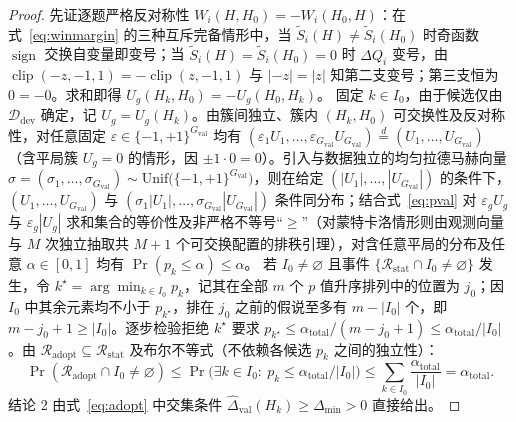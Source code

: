 \documentclass[UTF8,a4paper,10.5pt]{ctexart}
\newcommand{\Ddev}{\mathcal{D}_{\mathrm{dev}}}
\newcommand{\clip}{\operatorname{clip}}
\newcommand{\sgn}{\operatorname{sign}}
\begin{document}
\begin{proof}
先证逐题严格反对称性 $W_i(H,H_0)=-W_i(H_0,H)$：在式~\eqref{eq:winmargin} 的三种互斥完备情形中，当 $\tilde{S}_i(H)\neq\tilde{S}_i(H_0)$ 时奇函数 $\sgn$ 交换自变量即变号；当 $\tilde{S}_i(H)=\tilde{S}_i(H_0)=0$ 时 $\Delta Q_i$ 变号，由 $\clip(-z,-1,1)=-\clip(z,-1,1)$ 与 $|-z|=|z|$ 知第二支变号；第三支恒为 $0=-0$。求和即得 $U_g(H_k,H_0)=-U_g(H_0,H_k)$。
固定 $k\in I_0$，由于候选仅由 $\Ddev$ 确定，记 $U_g=U_g(H_k)$。由簇间独立、簇内 $(H_k,H_0)$ 可交换性及反对称性，对任意固定 $\varepsilon\in\{-1,+1\}^{G_{\mathrm{val}}}$ 均有 $(\varepsilon_1 U_1,\dots,\varepsilon_{G_{\mathrm{val}}}U_{G_{\mathrm{val}}})\stackrel{d}{=}(U_1,\dots,U_{G_{\mathrm{val}}})$（含平局簇 $U_g=0$ 的情形，因 $\pm 1\cdot 0=0$）。引入与数据独立的均匀拉德马赫向量 $\sigma=(\sigma_1,\dots,\sigma_{G_{\mathrm{val}}})\sim\mathrm{Unif}\bigl(\{-1,+1\}^{G_{\mathrm{val}}}\bigr)$，则在给定 $(|U_1|,\dots,|U_{G_{\mathrm{val}}}|)$ 的条件下，$(U_1,\dots,U_{G_{\mathrm{val}}})$ 与 $(\sigma_1|U_1|,\dots,\sigma_{G_{\mathrm{val}}}|U_{G_{\mathrm{val}}}|)$ 条件同分布；结合式~\eqref{eq:pval} 对 $\varepsilon_g U_g$ 与 $\varepsilon_g|U_g|$ 求和集合的等价性及非严格不等号“$\ge$”（对蒙特卡洛情形则由观测向量与 $M$ 次独立抽取共 $M+1$ 个可交换配置的排秩引理），对含任意平局的分布及任意 $\alpha\in[0,1]$ 均有 $\Pr(p_k\le\alpha)\le\alpha$。
若 $I_0\neq\varnothing$ 且事件 $\{\mathcal{R}_{\mathrm{stat}}\cap I_0\neq\varnothing\}$ 发生，令 $k^\star=\arg\min_{k\in I_0}p_k$，记其在全部 $m$ 个 $p$ 值升序排列中的位置为 $j_0$；因 $I_0$ 中其余元素均不小于 $p_{k^\star}$，排在 $j_0$ 之前的假说至多有 $m-|I_0|$ 个，即 $m-j_0+1\ge |I_0|$。逐步检验拒绝 $k^\star$ 要求 $p_{k^\star}\le\alpha_{\mathrm{total}}/(m-j_0+1)\le\alpha_{\mathrm{total}}/|I_0|$。由 $\mathcal{R}_{\mathrm{adopt}}\subseteq\mathcal{R}_{\mathrm{stat}}$ 及布尔不等式（不依赖各候选 $p_k$ 之间的独立性）：
\[
  \Pr(\mathcal{R}_{\mathrm{adopt}}\cap I_0\neq\varnothing)
  \le \Pr\bigl(\exists k\in I_0:\ p_k\le\alpha_{\mathrm{total}}/|I_0|\bigr)
  \le \sum_{k\in I_0}\frac{\alpha_{\mathrm{total}}}{|I_0|} = \alpha_{\mathrm{total}}.
\]
结论 2 由式~\eqref{eq:adopt} 中交集条件 $\hat{\Delta}_{\mathrm{val}}(H_k)\ge\Delta_{\min}>0$ 直接给出。
\end{proof}
\end{document}

